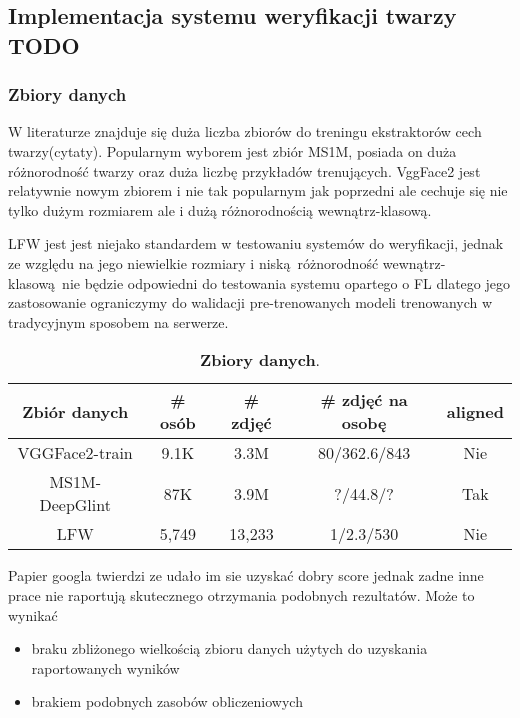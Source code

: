 

\subsection{Implementacja systemu weryfikacji twarzy TODO}

\subsubsection{Zbiory danych}

W literaturze znajduje się duża liczba zbiorów do treningu ekstraktorów cech twarzy(cytaty).
Popularnym wyborem jest zbiór MS1M, posiada on duża różnorodność twarzy oraz duża liczbę
przykładów trenujących. VggFace2 jest relatywnie nowym zbiorem i nie tak popularnym jak poprzedni
ale cechuje się nie tylko dużym rozmiarem ale i dużą różnorodnością wewnątrz-klasową.

LFW jest jest niejako standardem w testowaniu systemów do weryfikacji, jednak ze względu na jego niewielkie rozmiary i niską różnorodność wewnątrz-klasową nie będzie odpowiedni do testowania systemu opartego o FL dlatego jego zastosowanie ograniczymy do walidacji pre-trenowanych  modeli trenowanych w tradycyjnym sposobem na serwerze.



\begin{table}[h]
\begin{center}
\begin{tabular}{c|c|c|c|c}
\hline
Zbiór danych  & \# osób   &   \# zdjęć  &   \# zdjęć na osobę   &   aligned \\
\hline
VGGFace2-train \cite{DatasetVGGFace2}     & 9.1K & 3.3M & 80/362.6/843 & Nie  \\ 
MS1M-DeepGlint \cite{DatasetGlintweb}   & 87K  & 3.9M & ?/44.8/? & Tak \\
\hline
\hline
LFW \cite{DatasetLFW}   & 5,749  & 13,233 & 1/2.3/530 & Nie \\
\hline
\end{tabular}
\end{center}
\caption{\textbf{Zbiory danych}.}
\label{table:dataset}
\vspace{-4mm}
\end{table}


Papier googla twierdzi ze udało im sie uzyskać dobry score jednak zadne inne prace nie
raportują skutecznego otrzymania podobnych rezultatów. Może to wynikać
\begin{itemize}
    \item braku zbliżonego wielkością zbioru danych użytych do uzyskania raportowanych wyników
    \item brakiem podobnych zasobów obliczeniowych
\end{itemize}


